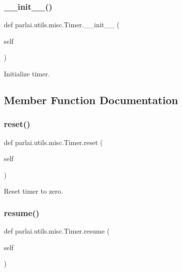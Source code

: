 \subsubsection{\texorpdfstring{\+\_\+\+\_\+init\+\_\+\+\_\+()}{\_\_init\_\_()}}
{\footnotesize\ttfamily def parlai.\+utils.\+misc.\+Timer.\+\_\+\+\_\+init\+\_\+\+\_\+ (\begin{DoxyParamCaption}\item[{}]{self }\end{DoxyParamCaption})}

\begin{DoxyVerb}Initialize timer.
\end{DoxyVerb}
 

\subsection{Member Function Documentation}
\mbox{\label{classparlai_1_1utils_1_1misc_1_1Timer_a68bdf8abb3fe00edc639b21944d03371}} 
\subsubsection{\texorpdfstring{reset()}{reset()}}
{\footnotesize\ttfamily def parlai.\+utils.\+misc.\+Timer.\+reset (\begin{DoxyParamCaption}\item[{}]{self }\end{DoxyParamCaption})}

\begin{DoxyVerb}Reset timer to zero.
\end{DoxyVerb}
 \mbox{\label{classparlai_1_1utils_1_1misc_1_1Timer_a855f1e8a3ba03fe16712fd7ae49dab46}} 
\subsubsection{\texorpdfstring{resume()}{resume()}}
{\footnotesize\ttfamily def parlai.\+utils.\+misc.\+Timer.\+resume (\begin{DoxyParamCaption}\item[{}]{self }\end{DoxyParamCaption})}

